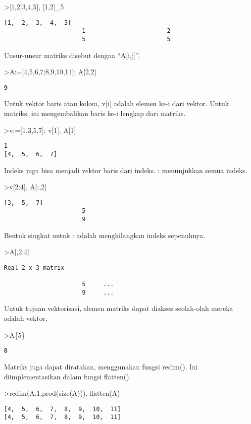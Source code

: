 \documentclass[
]{book}
\begin{document}
\textgreater{[}1,2{]}\textbar{[}3,4,5{]}, {[}1,2{]}\_5

\begin{verbatim}
[1,  2,  3,  4,  5]
                      1                       2 
                      5                       5 
\end{verbatim}

Unsur-unsur matriks disebut dengan ``A{[}i,j{]}''.

\textgreater A:={[}4,5,6,7;8,9,10,11{]}; A{[}2,2{]}

\begin{verbatim}
9
\end{verbatim}

Untuk vektor baris atau kolom, v{[}i{]} adalah elemen ke-i dari vektor. Untuk matriks, ini mengembalikan baris ke-i lengkap dari matriks.

\textgreater v:={[}1,3,5,7{]}; v{[}1{]}, A{[}1{]}

\begin{verbatim}
1
[4,  5,  6,  7]
\end{verbatim}

Indeks juga bisa menjadi vektor baris dari indeks. : menunjukkan semua indeks.

\textgreater v{[}2:4{]}, A{[}:,2{]}

\begin{verbatim}
[3,  5,  7]
                      5 
                      9 
\end{verbatim}

Bentuk singkat untuk : adalah menghilangkan indeks sepenuhnya.

\textgreater A{[},2:4{]}

\begin{verbatim}
Real 2 x 3 matrix

                      5     ...
                      9     ...
\end{verbatim}

Untuk tujuan vektorisasi, elemen matriks dapat diakses seolah-olah mereka adalah vektor.

\textgreater A\{5\}

\begin{verbatim}
8
\end{verbatim}

Matriks juga dapat diratakan, menggunakan fungsi redim(). Ini diimplementasikan dalam fungsi flatten().

\textgreater redim(A,1,prod(size(A))), flatten(A)

\begin{verbatim}
[4,  5,  6,  7,  8,  9,  10,  11]
[4,  5,  6,  7,  8,  9,  10,  11]
\end{verbatim}
\end{document}
